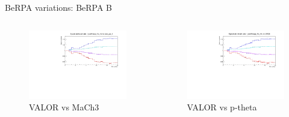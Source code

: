 \documentclass{beamer}
\begin{document}
\begin{frame}{BeRPA variations: BeRPA B}
	\centering
	\begin{columns}
		\begin{column}{0.5\paperwidth}
			\begin{figure}
				\includegraphics[page=8, trim={0cm 0cm 0cm 0cm}, clip, scale=0.35] {images/variations/valor_mach3/variations_prebanff_unosc_1Re}
				\caption{VALOR vs MaCh3}
			\end{figure}
		\end{column}
		\begin{column}{0.5\paperwidth}
			\begin{figure}
				\includegraphics[page=18, trim={0cm 0cm 0cm 0cm}, clip, scale=0.35] {images/variations/valor_ptheta/variations_prebanff_unosc_1Re}
				\caption{VALOR vs p-theta}
			\end{figure}
		\end{column}
	\end{columns}
\end{frame}
\end{document}
